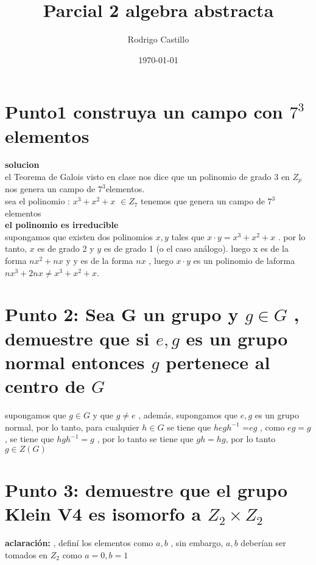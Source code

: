 \documentclass[10pt,a4paper]{article} %
\begin{document}
    \title{{  Parcial 2 algebra abstracta  }}
    \author{{Rodrigo Castillo}}
    \date{\today}

    \maketitle


    \section{Punto1 construya un campo con $7 ^{3} $elementos}
        \textbf{solucion}
        \\ el Teorema de Galois visto en clase nos dice que un polinomio de
        grado 3 en $Z_p$nos genera un campo de $7 ^{3} $elementos.
        \\
        sea el polinomio : $x ^{3}  +x ^{2} +  x $ $\in Z_7$ tenemos que genera
        un campo de $7 ^{3} $ elementos
        \\
        \textbf{el polinomio es irreducible}
        \\
        supongamos que existen dos polinomios $x,y$ tales que $x \cdot y = x
        ^{3}  + x ^{2}  + x$ .  por lo tanto, $x$ es de grado 2 y $y$ es de
        grado 1 (o el caso análogo). luego x es de la forma $nx ^{2}  + nx $ y
        y es de la forma $nx$ , luego $x \cdot y$ es un polinomio de laforma
        $nx ^{3} + 2nx \not= x ^{3} + x ^{2}  + x  $.

        \section{Punto 2:  Sea G un grupo y $g \in G$ , demuestre que si
        ${e,g}$ es un grupo normal entonces $g$ pertenece al centro de $G$}

        supongamos que $g \in G$  y que $g \not= e$ , además, supongamos que
        ${e,g}$ es un grupo normal, por lo tanto, para cualquier $h \in G$ se
        tiene que $hegh ^{-1} $ =$eg$ , como $eg = g$, se tiene que $ hgh ^{-1}
        = g$ , por lo tanto se tiene que $gh = hg$, por lo tanto $g \in Z(G)$


        \section{Punto 3: demuestre que el grupo Klein V4 es isomorfo a $Z_2 \times Z_2$}
        \textbf{aclaración:} , definí los elementos como $a,b$ , sin embargo, $a,b$
        deberían ser tomados en $Z_2$ como $a = 0 , b=1$
\end{document}
